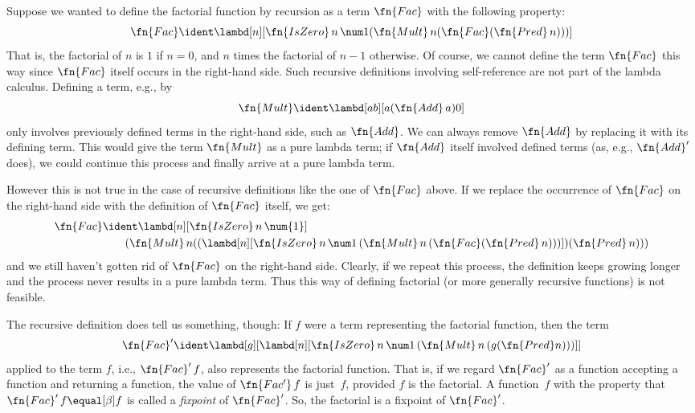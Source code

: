 \documentclass[../../../include/open-logic-section]{subfiles}
\begin{document}


Suppose we wanted to define the factorial function by recursion as a
term $\fn{Fac}$ with the following property:
\[
\fn{Fac} \ident \lambd[n][\fn{IsZero}\, n\, \num 1 (\fn{Mult}\, n (\fn{Fac}(\fn{Pred} \, n)))]
\]
That is, the factorial of $n$ is $1$ if $n = 0$, and $n$ times the
factorial of $n-1$ otherwise.  Of course, we cannot define the term
$\fn{Fac}$ this way since $\fn{Fac}$ itself occurs in the right-hand
side. Such recursive definitions involving self-reference
are not part of the lambda calculus. Defining a term, e.g., by
\[
\fn{Mult} \ident \lambd[ab][a (\fn{Add}\, a) 0]
\]
only involves previously defined terms in the right-hand side, such as
$\fn{Add}$. We can always remove $\fn{Add}$ by replacing it with its
defining term.  This would give the term $\fn{Mult}$ as a pure lambda
term; if $\fn{Add}$ itself involved defined terms (as, e.g.,
$\fn{Add}'$ does), we could continue this process and finally arrive at
a pure lambda term.

However this is not true in the case of recursive definitions like the
one of $\fn{Fac}$ above. If we replace the occurrence of $\fn{Fac}$ on
the right-hand side with the definition of $\fn{Fac}$ itself, we get:
\begin{align*}
  \fn{Fac} & \ident \lambd[n][\fn{IsZero}\, n\, \num{1}] \\
    & \qquad (\fn{Mult}\, n
  ((\lambd[n][\fn{IsZero} \, n \, \num 1\, (\fn{Mult}\, n\, (\fn{Fac}
    (\fn{Pred}\, n)))]) (\fn{Pred}\, n)))
\end{align*}
and we still haven't gotten rid of $\fn{Fac}$ on the right-hand
side. Clearly, if we repeat this process, the definition keeps growing
longer and the process never results in a pure lambda term. Thus this
way of defining factorial (or more generally recursive functions)
is not feasible.

The recursive definition does tell us something, though: If $f$ were a
term representing the factorial function, then the term
\[
\fn{Fac}' \ident \lambd[g][\lambd[n][\fn{IsZero} \, n \, \num 1\, (\fn{Mult} \, n\, (g (\fn{Pred} n)))]]
\]
applied to the term $f$, i.e., $\fn{Fac}'\,f$, also represents the
factorial function.  That is, if we regard $\fn{Fac}'$ as a function
accepting a function and returning a function, the value of
$\fn{Fac'}\, f$ is just~$f$, provided $f$ is the factorial. A
function~$f$ with the property that $\fn{Fac}' \, f \equal[\beta] f$ is called
a \emph{fixpoint} of $\fn{Fac}'$. So, the factorial is a fixpoint of
$\fn{Fac}'$.
\end{document}
